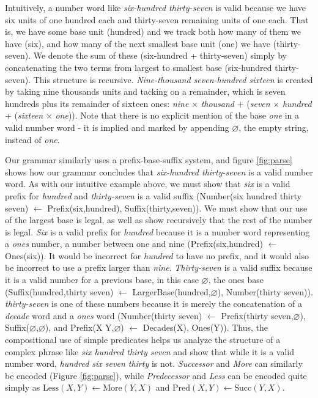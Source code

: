 \documentclass[10pt,letterpaper]{article}
\begin{document}
Intuitively, a number word like \emph{six-hundred thirty-seven} is
valid because we have six units of one hundred each and thirty-seven
remaining units of one each. That is, we have some base unit (hundred)
and we track both how many of them we have (six), and how many of the
next smallest base unit (one) we have (thirty-seven). We denote the
sum of these (six-hundred + thirty-seven) simply by concatenating the
two terms from largest to smallest base (six-hundred thirty-seven).
This structure is recursive. \emph{Nine-thousand seven-hundred
  sixteen} is created by taking nine thousands units and tacking on a
remainder, which is seven hundreds plus its remainder of sixteen ones:
\emph{nine} $\times$ \emph{thousand} $+$ (\emph{seven} $\times$
\emph{hundred} + (\emph{sixteen} $\times$ \emph{one})). Note that
there is no explicit mention of the base \emph{one} in a valid number
word - it is implied and marked by appending $\varnothing$, the empty
string, instead of \emph{one}.

Our grammar similarly uses a prefix-base-suffix system, and figure
\ref{fig:parse} shows how our grammar concludes that \emph{six-hundred
  thirty-seven} is a valid number word. As with our intuitive example
above, we must show that \emph{six} is a valid prefix for
\emph{hundred} and \emph{thirty-seven} is a valid suffix (Number(six
hundred thirty seven) $\leftarrow$ Prefix(six,hundred),
Suffix(thirty,seven)). We must show that our use of the largest base
is legal, as well as show recursively that the rest of the number is
legal. \emph{Six} is a valid prefix for \emph{hundred} because it is a
number word representing a \emph{ones} number, a number between one
and nine (Prefix(six,hundred) $\leftarrow$ Ones(six)). It would be
incorrect for \emph{hundred} to have no prefix, and it would also be
incorrect to use a prefix larger than \emph{nine}. \emph{Thirty-seven}
is a valid suffix because it is a valid number for a previous base, in
this case $\varnothing$, the ones base (Suffix(hundred,thirty seven)
$\leftarrow$ LargerBase(hundred,$\varnothing$), Number(thirty seven)).
\emph{thirty-seven} is one of these numbers because it is merely the
concatenation of a \emph{decade} word and a \emph{ones} word
(Number(thirty seven) $\leftarrow$ Prefix(thirty seven,$\varnothing$),
Suffix($\varnothing$,$\varnothing$), and Prefix(X Y,$\varnothing$)
$\leftarrow$ Decades(X), Ones(Y)). Thus, the compositional use of
simple predicates helps us analyze the structure of a complex phrase
like \emph{six hundred thirty seven} and show that while it is a valid
number word, \emph{hundred six seven thirty} is not. \emph{Successor}
and \emph{More} can similarly be encoded (Figure \ref{fig:parse}),
while \emph{Predecessor} and \emph{Less} can be encoded quite simply
as $\text{Less}(X,Y) \leftarrow \text{More}(Y,X)$ and
$\text{Pred}(X,Y) \leftarrow \text{Succ}(Y,X)$.
\end{document}
